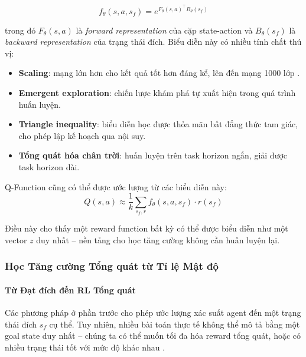 \begin{equation}
    f_\theta(s, a, s_f) = e^{F_\theta(s,a)^\top B_\theta(s_f)}
    \label{eq:log_linear}
\end{equation}

trong đó $F_\theta(s, a)$ là \textit{forward representation} của cặp
state-action và $B_\theta(s_f)$ là \textit{backward representation}
của trạng thái đích. Biểu diễn này có nhiều tính chất thú vị:
\begin{itemize}
    \item \textbf{Scaling}: mạng lớn hơn cho kết quả tốt hơn đáng kể,
    lên đến mạng 1000 lớp \cite{eysenbach2025generativerl}.
    \item \textbf{Emergent exploration}: chiến lược khám phá tự xuất
    hiện trong quá trình huấn luyện.
    \item \textbf{Triangle inequality}: biểu diễn học được thỏa mãn
    bất đẳng thức tam giác, cho phép lập kế hoạch qua nội suy.
    \item \textbf{Tổng quát hóa chân trời}: huấn luyện trên task
    horizon ngắn, giải được task horizon dài.
\end{itemize}

Q-Function cũng có thể được ước lượng từ các biểu diễn này:
\begin{equation}
    Q(s, a) \approx \frac{1}{k} \sum_{s_f, r} f_\theta(s, a, s_f)
    \cdot r(s_f)
    \label{eq:q_from_repr}
\end{equation}

Điều này cho thấy một reward function bất kỳ có thể được biểu diễn
như một vector $z$ duy nhất -- nền tảng cho học tăng cường không cần huấn luyện lại.

\subsubsection{Học Tăng cường Tổng quát từ Tỉ lệ Mật độ}

\paragraph{Từ Đạt đích đến RL Tổng quát}

Các phương pháp ở phần trước cho phép ước lượng xác suất agent đến
một trạng thái đích $s_f$ cụ thể. Tuy nhiên, nhiều bài toán thực tế
không thể mô tả bằng một goal state duy nhất -- chúng ta có thể muốn
tối đa hóa reward tổng quát, hoặc có nhiều trạng thái tốt với mức độ
khác nhau \cite{eysenbach2025generativerl}.

